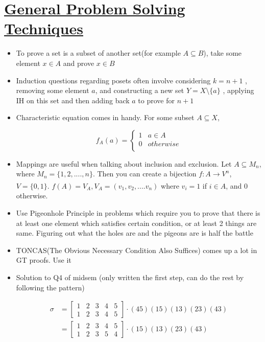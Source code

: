 \documentclass{article}
\theoremstyle{definition}
\theoremstyle{definition}
\theoremstyle{named}
\begin{document}
\section{\underline{General Problem Solving Techniques}}
\begin{itemize}
\item To prove a set is a subset of another set(for example $A \subseteq B$), take some element $x \in A$ and prove $x \in B$ 
\item Induction questions regarding posets often involve considering $k=n+1$ , removing some element $a$, and constructing a new set $Y = X \setminus  \{a\}$ , applying IH on this set and then adding back $a$ to prove for $n+1$
\item  Characteristic equation comes in handy. For some subset $A \subseteq X$, 


\[
f_A(a) =\left\{
\begin{array}{ll}
      1 & a \in  A\\
      0 & otherwise \\
\end{array} 
\right.
        \]

\item Mappings are useful when talking about inclusion and exclusion. Let $A \subseteq M_n$, where $M_n = \{1, 2, ...., n\}$. Then you can create a bijection $f:A \xrightarrow[]{} V^{n}$, $V = \{0, 1\}$. $f(A) = V_A, V_A = (v_1, v_2, .... v_n)$ where $v_i = 1$ if $i \in A$, and 0 otherwise. 

\item Use Pigeonhole Principle in problems which require you to prove that there is at least one element which satisfies certain condition, or at least 2 things are same. Figuring out what the holes are and the pigeons are is half the battle 

\item TONCAS(The Obvious Necessary Condition Also Suffices) comes up a lot in GT proofs. Use it

\item Solution to Q4 of midsem (only written the first step, can do the rest by following the pattern)

\[
\begin{aligned}
\sigma  &= \begin{bmatrix}
1 & 2 & 3 & 4 & 5 \\
1 & 2 & 3 & 4 & 5 
\end{bmatrix}  \cdot (45)(15)(13)(23)(43) \\  
&= \begin{bmatrix}
1 & 2 & 3 & 4 & 5 \\
1 & 2 & 3 & 5 & 4 
\end{bmatrix}  \cdot (15)(13)(23)(43) \\
\end{aligned}
\]

\end{itemize}
\end{document}
